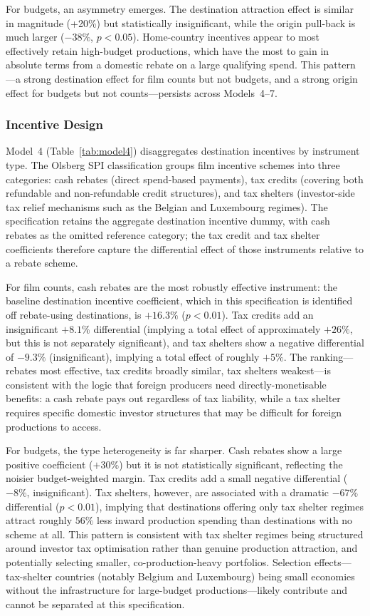 For budgets, an asymmetry emerges. The destination attraction effect is similar in magnitude (+20\%) but statistically insignificant, while the origin pull-back is much larger ($-38\%$, $p < 0.05$). Home-country incentives appear to most effectively retain high-budget productions, which have the most to gain in absolute terms from a domestic rebate on a large qualifying spend. This pattern---a strong destination effect for film counts but not budgets, and a strong origin effect for budgets but not counts---persists across Models~4--7.

\subsubsection{Incentive Design}

Model~4 (Table~\ref{tab:model4}) disaggregates destination incentives by instrument type. The Olsberg SPI classification groups film incentive schemes into three categories: cash rebates (direct spend-based payments), tax credits (covering both refundable and non-refundable credit structures), and tax shelters (investor-side tax relief mechanisms such as the Belgian and Luxembourg regimes). The specification retains the aggregate destination incentive dummy, with cash rebates as the omitted reference category; the tax credit and tax shelter coefficients therefore capture the differential effect of those instruments relative to a rebate scheme.

For film counts, cash rebates are the most robustly effective instrument: the baseline destination incentive coefficient, which in this specification is identified off rebate-using destinations, is $+16.3\%$ ($p < 0.01$). Tax credits add an insignificant $+8.1\%$ differential (implying a total effect of approximately $+26\%$, but this is not separately significant), and tax shelters show a negative differential of $-9.3\%$ (insignificant), implying a total effect of roughly $+5\%$. The ranking---rebates most effective, tax credits broadly similar, tax shelters weakest---is consistent with the logic that foreign producers need directly-monetisable benefits: a cash rebate pays out regardless of tax liability, while a tax shelter requires specific domestic investor structures that may be difficult for foreign productions to access.

For budgets, the type heterogeneity is far sharper. Cash rebates show a large positive coefficient ($+30\%$) but it is not statistically significant, reflecting the noisier budget-weighted margin. Tax credits add a small negative differential ($-8\%$, insignificant). Tax shelters, however, are associated with a dramatic $-67\%$ differential ($p < 0.01$), implying that destinations offering only tax shelter regimes attract roughly $56\%$ less inward production spending than destinations with no scheme at all. This pattern is consistent with tax shelter regimes being structured around investor tax optimisation rather than genuine production attraction, and potentially selecting smaller, co-production-heavy portfolios. Selection effects---tax-shelter countries (notably Belgium and Luxembourg) being small economies without the infrastructure for large-budget productions---likely contribute and cannot be separated at this specification.

